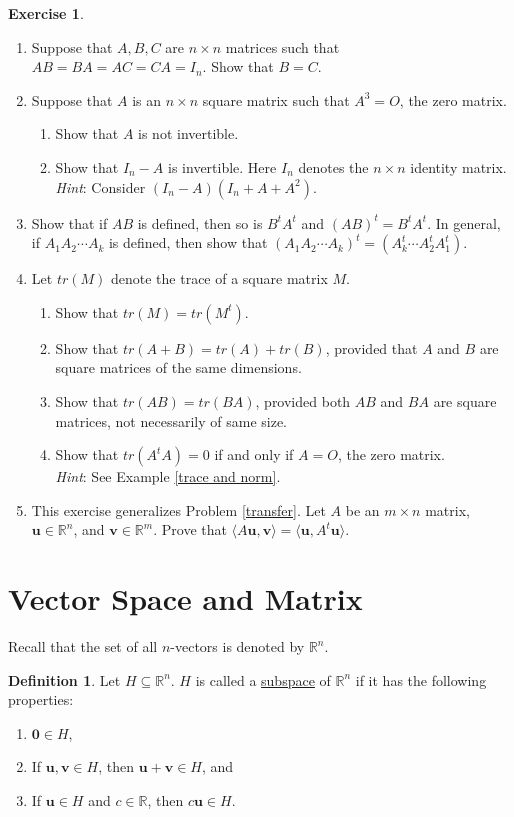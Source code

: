 \documentclass[12pt,letterpaper]{book}
\numberwithin{equation}{section}
\theoremstyle{definition}
\newtheorem{defi}[thm]{\textbf{Definition}}
\newtheorem{exercise}{\textbf{Exercise}}[chapter]
\newcommand{\vu}{\bm{u}}
\newcommand{\vv}{\bm{v}}
\newcommand{\veczero}{\bm{0}}
\begin{document}
\begin{exercise}
\begin{enumerate}[\bfseries 1.]
\item\label{unique inv} Suppose that $A,B,C$ are $n\times n$ matrices such that $AB=BA=AC=CA=I_n$. Show that $B=C$.
\item Suppose that $A$ is an $n\times n$ square matrix such that $A^3=O$, the zero matrix.
\begin{enumerate}
\item Show that $A$ is not invertible.
\item Show that $I_n-A$ is invertible. Here $I_n$ denotes the $n\times n$ identity matrix. \\
\textit{Hint}: Consider $(I_n-A)(I_n+A+A^2)$.
\end{enumerate}
\item\label{transpose change} Show that if $AB$ is defined, then so is $B^tA^t$ and $(AB)^t=B^tA^t$. In general, if $A_1A_2\cdots A_k$ is defined, then show that $(A_1A_2\cdots A_k)^t=(A_k^t\cdots A_2^tA_1^t)$.
\item\label{tracedef} Let $tr(M)$ denote the trace of a square matrix $M$.
\begin{enumerate}
\item Show that $tr(M)=tr(M^t)$.
\item Show that $tr(A+B)=tr(A)+tr(B)$, provided that $A$ and $B$ are square matrices of the same dimensions.
\item Show that $tr(AB)=tr(BA)$, provided both $AB$ and $BA$ are square matrices, not necessarily of same size.
\item Show that $tr(A^tA)=0$ if and only if $A=O$, the zero matrix. \\ \textit{Hint}: See Example \ref{trace and norm}.
\end{enumerate}
\item\label{general transfer} This exercise generalizes Problem \ref{transfer}. Let $A$ be an $m\times n$ matrix, $\vu\in \mathbb{R}^n$, and $\vv\in \mathbb{R}^m$. Prove that $\langle A\vu,\vv\rangle =\langle \vu, A^t\vu\rangle$.
\end{enumerate}
\end{exercise}

\section{Vector Space and Matrix}

Recall that the set of all $n$-vectors is denoted by $\mathbb{R}^n$.

\begin{defi} \label{subspace defi}
Let $H\subseteq \mathbb{R}^n$. $H$ is called a \underline{subspace} of $\mathbb{R}^n$ if it has the following properties:
\begin{enumerate}
\item $\veczero\in H$,
\item If $\vu,\vv\in H$, then $\vu+\vv\in H$, and
\item If $\vu\in H$ and $c\in \mathbb{R}$, then $c\vu\in H$.
\end{enumerate}
\end{defi}
\end{document}
